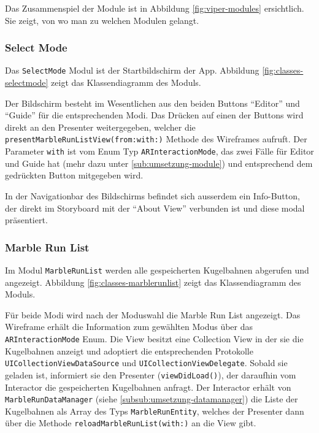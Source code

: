 Das Zusammenspiel der Module ist in Abbildung \ref{fig:viper-modules} ersichtlich.
Sie zeigt, von wo man zu welchen Modulen gelangt.


\subsubsection{Select Mode}

Das \texttt{SelectMode} Modul ist der Startbildschirm der App.
Abbildung \ref{fig:classes-selectmode} zeigt das Klassendiagramm des Moduls.


Der Bildschirm besteht im Wesentlichen aus den beiden Buttons "`Editor"' und "`Guide"' für die entsprechenden Modi.
Das Drücken auf einen der Buttons wird direkt an den Presenter weitergegeben, welcher die \texttt{presentMarbleRunListView(from:with:)} Methode des Wireframes aufruft.
Der Parameter \texttt{with} ist vom Enum Typ \texttt{ARInteractionMode}, das zwei Fälle für Editor und Guide hat (mehr dazu unter \ref{sub:umsetzung-module}) und entsprechend dem gedrückten Button mitgegeben wird.

In der Navigationbar des Bildschirms befindet sich ausserdem ein Info-Button, der direkt im Storyboard mit der "`About View"' verbunden ist und diese modal präsentiert. %

\subsubsection{Marble Run List}

Im Modul \texttt{MarbleRunList} werden alle gespeicherten Kugelbahnen abgerufen und angezeigt.
Abbildung \ref{fig:classes-marblerunlist} zeigt das Klassendiagramm des Moduls.


Für beide Modi wird nach der Moduswahl die Marble Run List angezeigt.
Das Wireframe erhält die Information zum gewählten Modus über das \texttt{ARInteractionMode} Enum.
Die View besitzt eine Collection View in der sie die Kugelbahnen anzeigt und adoptiert die entsprechenden Protokolle \texttt{UICollectionViewDataSource} und \texttt{UICollectionViewDelegate}.
Sobald sie geladen ist, informiert sie den Presenter (\texttt{viewDidLoad()}), der daraufhin vom Interactor die gespeicherten Kugelbahnen anfragt.
Der Interactor erhält von \texttt{MarbleRunDataManager} (siehe \ref{subsub:umsetzung-datamanager}) die Liste der Kugelbahnen als Array des Typs \texttt{MarbleRunEntity}, welches der Presenter dann über die Methode \texttt{reloadMarbleRunList(with:)} an die View gibt.

